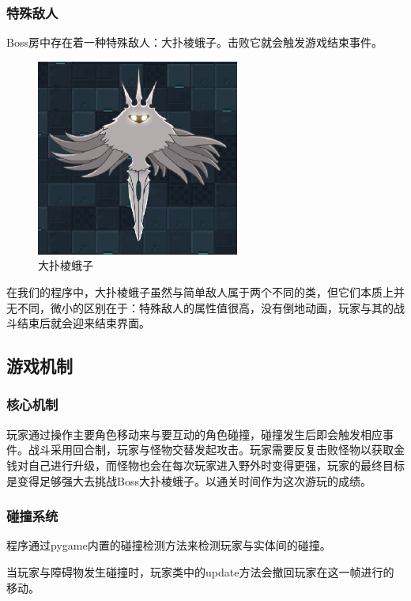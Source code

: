 \documentclass{ctexart}
\begin{document}
\subsubsection{特殊敌人}
Boss房中存在着一种特殊敌人：大扑棱蛾子。击败它就会触发游戏结束事件。
\begin{figure}[h]
\centering
\includegraphics[width=0.7\linewidth]{大扑棱蛾子.png}
\caption{\label{fig:大扑棱蛾子}大扑棱蛾子}
\end{figure}

在我们的程序中，大扑棱蛾子虽然与简单敌人属于两个不同的类，但它们本质上并无不同，微小的区别在于：特殊敌人的属性值很高，没有倒地动画，玩家与其的战斗结束后就会迎来结束界面。

\subsection{游戏机制}
\subsubsection{核心机制}
玩家通过操作主要角色移动来与要互动的角色碰撞，碰撞发生后即会触发相应事件。战斗采用回合制，玩家与怪物交替发起攻击。玩家需要反复击败怪物以获取金钱对自己进行升级，而怪物也会在每次玩家进入野外时变得更强，玩家的最终目标是变得足够强大去挑战Boss大扑棱蛾子。以通关时间作为这次游玩的成绩。

\subsubsection{碰撞系统}
程序通过pygame内置的碰撞检测方法来检测玩家与实体间的碰撞。

当玩家与障碍物发生碰撞时，玩家类中的update方法会撤回玩家在这一帧进行的移动。
\end{document}
